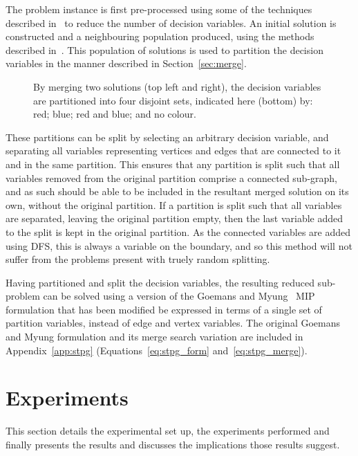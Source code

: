 \documentclass[journal]{IEEEtran}
\begin{document}

The problem instance is first pre-processed using some of the techniques described in~\cite{pp:duin,pp:uchoa,stpg-reduce} to reduce the number of decision variables. An initial solution is constructed and a neighbouring population produced, using the methods described in~\cite{gecco16}. This population of solutions is used to partition the decision variables in the manner described in Section~\ref{sec:merge}.

\begin{figure}[h]
\centering
{}
    \caption[Partitioning variables by merging solutions]{By merging two solutions (top left and right), the decision variables are partitioned into four disjoint sets, indicated here (bottom) by: red; blue; red and blue; and no colour.}\label{fig:stpg-partition} 
\end{figure}

These partitions can be split by selecting an arbitrary decision variable, and separating all variables representing vertices and edges that are connected to it and in the same partition. This ensures that any partition is split such that all variables removed from the original partition comprise a connected sub-graph, and as such should be able to be included in the resultant merged solution on its own, without the original partition. If a partition is split such that all variables are separated, leaving the original partition empty, then the last variable added to the split is kept in the original partition. As the connected variables are added using DFS, this is always a variable on the boundary, and so this method will not suffer from the problems present with truely random splitting. 

Having partitioned and split the decision variables, the resulting reduced sub-problem can be solved using a version of the Goemans and Myung~\cite{goemans} MIP formulation that has been modified be expressed in terms of a single set of partition variables, instead of edge and vertex variables. The original Goemans and Myung formulation and its merge search variation are included in Appendix~\ref{app:stpg} (Equations~\ref{eq:stpg_form} and~\ref{eq:stpg_merge}).


\section{Experiments}\label{sec:exper}
This section details the experimental set up, the experiments performed and finally presents the results and discusses the implications those results suggest.
\end{document}
